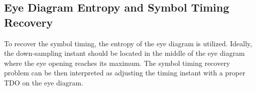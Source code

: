 \documentclass[journal,comsoc]{IEEEtran}
\begin{document}
\subsection{Eye Diagram Entropy and Symbol Timing Recovery}
\label{sec:eye_entp}
To recover the symbol timing, the entropy of the eye diagram is utilized. 
Ideally, the down-sampling instant should be located in the middle of the eye diagram where the eye opening reaches its maximum.
The symbol timing recovery problem can be then interpreted as adjusting the timing instant with a proper TDO on the eye diagram.
\end{document}
